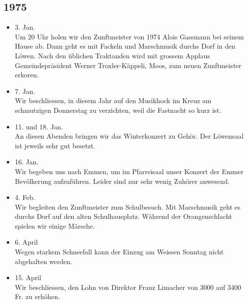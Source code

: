 \subsection*{1975}

\begin{history}

    \begin{itemize}

        \item 3. Jan.\\
              Um 20 Uhr holen wir den Zunftmeister von 1974 Alois Gassmann bei seinem
              Hause ab. Dann geht es mit Fackeln und Marschmusik durchs Dorf in den
              Löwen. Nach den üblichen Traktanden wird mit grossem Applaus
              Gemeindepräsident Werner Troxler-Käppeli, Moos, zum neuen Zunftmeister
              erkoren.

        \item 7. Jan.\\
              Wir beschliessen, in diesem Jahr auf den Musikhock im Kreuz am
              schmutzigen Donnerstag zu verzichten, weil die Fastnacht so kurz ist.

        \item 11. und 18. Jan.\\
              An diesen Abenden bringen wir das Winterkonzert zu Gehör. Der Löwensaal
              ist jeweils sehr gut besetzt.

        \item 16. Jan.\\
              Wir begeben uns nach Emmen, um im Pfarreisaal unser Konzert der Emmer
              Bevölkerung aufzuführen. Leider sind nur sehr wenig Zuhörer anwesend.

        \item 4. Feb.\\
              Wir begleiten den Zunftmeister zum Schulbesuch. Mit Marschmusik geht es
              durchs Dorf auf den alten Schulhausplatz. Während der Orangenschlacht
              spielen wir einige Märsche.

        \item 6. April\\
              Wegen starkem Schneefall kann der Einzug am Weissen Sonntag nicht
              abgehalten werden.

        \item 15. April\\
              Wir beschliessen, den Lohn von Direktor Franz Limacher von 3000 auf 3400
              Fr. zu erhöhen.


\end{itemize}
\end{history}
